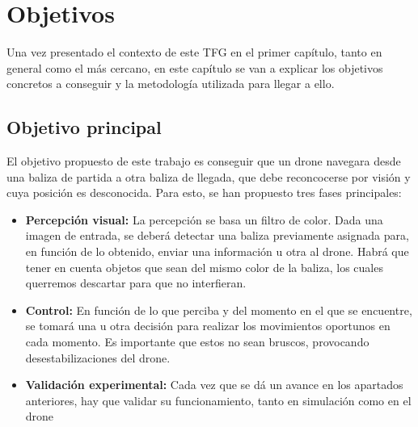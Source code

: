 \chapter{Objetivos}\label{cap.Objetivos}
\hspace{1 cm} Una vez presentado el contexto de este TFG en el primer cap\'itulo, tanto en general como el m\'as cercano, en este cap\'itulo se van a explicar los objetivos concretos a conseguir y la metodolog\'ia utilizada para llegar a ello.

\section{Objetivo principal}
\hspace{1 cm} El objetivo propuesto de este trabajo es conseguir que un drone navegara desde una baliza de partida a otra baliza de llegada, que debe reconcocerse por visi\'on y cuya posici\'on es desconocida. Para esto, se han propuesto tres fases principales:

\begin{itemize}
\item \textbf{Percepci\'on visual:} La percepci\'on se basa un filtro de color. Dada una imagen de entrada, se deber\'a detectar una baliza previamente asignada para, en funci\'on de lo obtenido, enviar una informaci\'on u otra al drone. Habr\'a que tener en cuenta objetos que sean del mismo color de la baliza, los cuales querremos descartar para que no interfieran. 

\item \textbf{Control:} En funci\'on de lo que perciba y del momento en el que se encuentre, se tomar\'a una u otra decisi\'on para realizar los movimientos oportunos en cada momento. Es importante que estos no sean bruscos, provocando desestabilizaciones del drone.

\item \textbf{Validaci\'on experimental:} Cada vez que se d\'a un avance en los apartados anteriores, hay que validar su funcionamiento, tanto en simulaci\'on como en el drone

\end{itemize}

